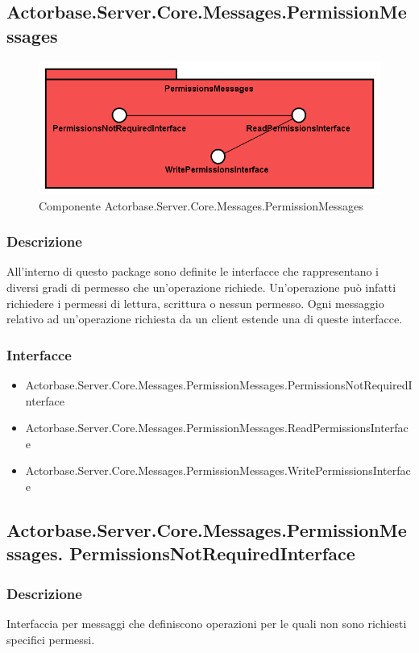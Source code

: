 \documentclass[a4paper]{article}
\begin{document}
			\subsection{Actorbase.Server.Core.Messages.PermissionMessages}
			\begin{figure} [H]
			\centering
			\includegraphics[scale=0.65]{Server/Package/PermissionsMessagesLevel.png}
			\caption{Componente Actorbase.Server.Core.Messages.PermissionMessages}
			\end{figure}
			\subsubsection{Descrizione}
				All'interno di questo package sono definite le interfacce che rappresentano i diversi gradi di permesso che un'operazione richiede. Un'operazione può infatti richiedere i permessi di lettura, scrittura o nessun permesso. Ogni messaggio relativo ad un'operazione richiesta da un client estende una di queste interfacce.
			\subsubsection{Interfacce}
			\begin{itemize}
				\item Actorbase.Server.Core.Messages.PermissionMessages.PermissionsNotRequiredInterface
				\item Actorbase.Server.Core.Messages.PermissionMessages.ReadPermissionsInterface
				\item Actorbase.Server.Core.Messages.PermissionMessages.WritePermissionsInterface
			\end{itemize}

			\subsection{Actorbase.Server.Core.Messages.PermissionMessages.
			PermissionsNotRequiredInterface}
			\subsubsection{Descrizione}
				Interfaccia per messaggi che definiscono operazioni per le quali non sono richiesti specifici permessi.
\end{document}
